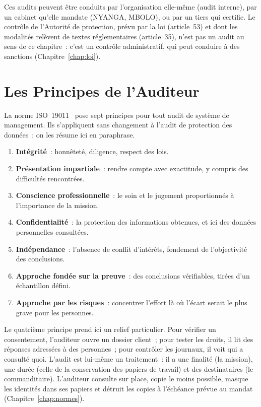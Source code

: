 Ces audits peuvent être conduits par l'organisation elle-même (audit
interne), par un cabinet qu'elle mandate (NYANGA, MBOLO), ou par un tiers qui
certifie. Le contrôle de l'Autorité de protection, prévu par la loi
(article~53) et dont les modalités relèvent de textes réglementaires
(article~35), n'est pas un audit au sens de ce chapitre~: c'est un contrôle
administratif, qui peut conduire à des sanctions (Chapitre~\ref{chap:loi}).

\section{Les Principes de l'Auditeur}
\label{sec:c03-principes}

La norme ISO~19011~\cite{iso19011_2018} pose sept principes pour tout audit
de système de management. Ils s'appliquent sans changement à l'audit de
protection des données~; on les résume ici en paraphrase.

\begin{enumerate}
    \item \textbf{Intégrité}~: honnêteté, diligence, respect des lois.
    \item \textbf{Présentation impartiale}~: rendre compte avec exactitude,
          y compris des difficultés rencontrées.
    \item \textbf{Conscience professionnelle}~: le soin et le jugement
          proportionnés à l'importance de la mission.
    \item \textbf{Confidentialité}~: la protection des informations
          obtenues, et ici des données personnelles consultées.
    \item \textbf{Indépendance}~: l'absence de conflit d'intérêts, fondement
          de l'objectivité des conclusions.
    \item \textbf{Approche fondée sur la preuve}~: des conclusions
          vérifiables, tirées d'un échantillon défini.
    \item \textbf{Approche par les risques}~: concentrer l'effort là où
          l'écart serait le plus grave pour les personnes.
\end{enumerate}

Le quatrième principe prend ici un relief particulier. Pour vérifier un
consentement, l'auditeur ouvre un dossier client~; pour tester les droits,
il lit des réponses adressées à des personnes~; pour contrôler les
journaux, il voit qui a consulté quoi. L'audit est lui-même un traitement~:
il a une finalité (la mission), une durée (celle de la conservation des
papiers de travail) et des destinataires (le commanditaire). L'auditeur
consulte sur place, copie le moins possible, masque les identités dans ses
papiers et détruit les copies à l'échéance prévue au mandat
(Chapitre~\ref{chap:normes}).

